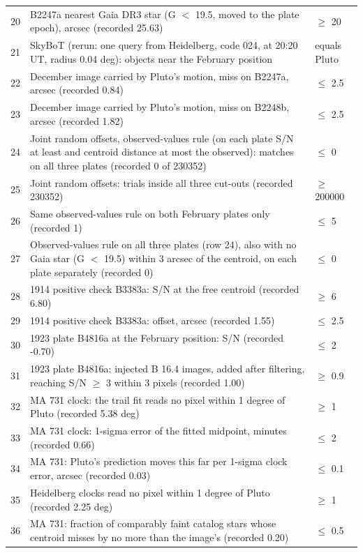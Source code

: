 \documentclass[11pt]{article}
\begin{document}
\begin{appendices}
\begin{table}[p]
\begin{tabular}{@{}rp{}l@{}}
20 & B2247a nearest Gaia DR3 star (G $<$ 19.5, moved to the plate epoch), arcsec (recorded 25.63) & $\ge$ 20 \\
21 & SkyBoT (rerun: one query from Heidelberg, code 024, at 20:20 UT, radius 0.04 deg): objects near the February position & equals Pluto \\
22 & December image carried by Pluto's motion, miss on B2247a, arcsec (recorded 0.84) & $\le$ 2.5 \\
23 & December image carried by Pluto's motion, miss on B2248b, arcsec (recorded 1.82) & $\le$ 2.5 \\
24 & Joint random offsets, observed-values rule (on each plate S/N at least and centroid distance at most the observed): matches on all three plates (recorded 0 of 230352) & $\le$ 0 \\
25 & Joint random offsets: trials inside all three cut-outs (recorded 230352) & $\ge$ 200000 \\
26 & Same observed-values rule on both February plates only (recorded 1) & $\le$ 5 \\
27 & Observed-values rule on all three plates (row 24), also with no Gaia star (G $<$ 19.5) within 3 arcsec of the centroid, on each plate separately (recorded 0) & $\le$ 0 \\
28 & 1914 positive check B3383a: S/N at the free centroid (recorded 6.80) & $\ge$ 6 \\
29 & 1914 positive check B3383a: offset, arcsec (recorded 1.55) & $\le$ 2.5 \\
30 & 1923 plate B4816a at the February position: S/N (recorded -0.70) & $\le$ 2 \\
31 & 1923 plate B4816a: injected B 16.4 images, added after filtering, reaching S/N $\ge$ 3 within 3 pixels (recorded 1.00) & $\ge$ 0.9 \\
32 & MA 731 clock: the trail fit reads no pixel within 1 degree of Pluto (recorded 5.38 deg) & $\ge$ 1 \\
33 & MA 731 clock: 1-sigma error of the fitted midpoint, minutes (recorded 0.66) & $\le$ 2 \\
34 & MA 731: Pluto's prediction moves this far per 1-sigma clock error, arcsec (recorded 0.03) & $\le$ 0.1 \\
35 & Heidelberg clocks read no pixel within 1 degree of Pluto (recorded 2.25 deg) & $\ge$ 1 \\
36 & MA 731: fraction of comparably faint catalog stars whose centroid misses by no more than the image's (recorded 0.20) & $\le$ 0.5 \\

\end{tabular}
\end{table}
\end{appendices}
\end{document}
